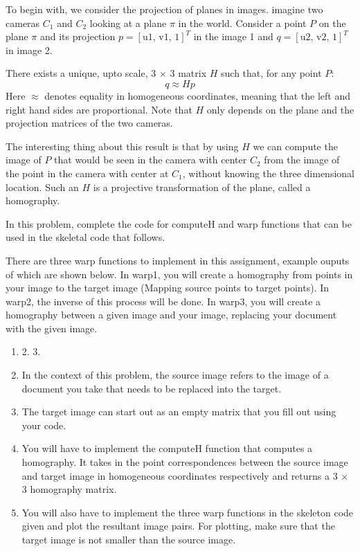 \documentclass[11pt]{article}
\begin{document}
To begin with, we consider the projection of planes in images. imagine
two cameras \(C_1\) and \(C_2\) looking at a plane \(\pi\) in the world.
Consider a point \(P\) on the plane \(\pi\) and its projection
\(p=[\text{u1, v1, 1}]^T\) in the image 1 and \(q=[\text{u2, v2, 1}]^T\)
in image 2.

There exists a unique, upto scale, 3 \(\times\) 3 matrix \(H\) such
that, for any point \(P\): \[q \approx Hp\] Here \(\approx\) denotes
equality in homogeneous coordinates, meaning that the left and right
hand sides are proportional. Note that \(H\) only depends on the plane
and the projection matrices of the two cameras.

The interesting thing about this result is that by using \(H\) we can
compute the image of \(P\) that would be seen in the camera with center
\(C_2\) from the image of the point in the camera with center at
\(C_1\), without knowing the three dimensional location. Such an \(H\)
is a projective transformation of the plane, called a homography.

In this problem, complete the code for computeH and warp functions that
can be used in the skeletal code that follows.

There are three warp functions to implement in this assignment, example
ouputs of which are shown below. In warp1, you will create a homography
from points in your image to the target image (Mapping source points to
target points). In warp2, the inverse of this process will be done. In
warp3, you will create a homography between a given image and your
image, replacing your document with the given image.

\begin{enumerate}
\def\labelenumi{\arabic{enumi}.}
\item
   2. 3.
\item
  In the context of this problem, the source image refers to the image
  of a document you take that needs to be replaced into the target.
\item
  The target image can start out as an empty matrix that you fill out
  using your code.
\item
  You will have to implement the computeH function that computes a
  homography. It takes in the point correspondences between the source
  image and target image in homogeneous coordinates respectively and
  returns a 3 \(\times\) 3 homography matrix.
\item
  You will also have to implement the three warp functions in the
  skeleton code given and plot the resultant image pairs. For plotting,
  make sure that the target image is not smaller than the source image.
\end{enumerate}
\end{document}
